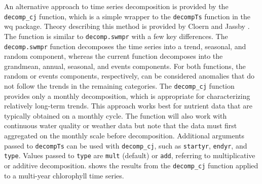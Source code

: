\documentclass[10pt,letterpaper]{article}\usepackage[]{graphicx}\usepackage[]{color}
\begin{document}
An alternative approach to time series decomposition is provided by the \texttt{decomp\_cj} function, which is a simple wrapper to the \texttt{decompTs} function in the wq package.  Theory describing this method is provided by Cloern and Jassby \cite{Cloern10}.  The function is similar to \texttt{decomp.swmpr} with a few key differences.  The \texttt{decomp.swmpr} function decomposes the time series into a trend, seasonal, and random component, whereas the current function decomposes into the grandmean, annual, seasonal, and events components.  For both functions, the random or events components, respectively, can be considered anomalies that do not follow the trends in the remaining categories.  The \texttt{decomp\_cj} function provides only a monthly decomposition, which is appropriate for characterizing relatively long-term trends.  This approach works best for nutrient data that are typically obtained on a monthly cycle.  The function will also work with continuous water quality or weather data but note that the data must first aggregated on the monthly scale before decomposition.  Additional arguments passed to \texttt{decompTs} can be used with \texttt{decomp\_cj}, such as \texttt{startyr}, \texttt{endyr}, and \texttt{type}.  Values passed to \texttt{type} are \texttt{mult} (default) or \texttt{add}, referring to multiplicative or additive decomposition.   shows the results from the \texttt{decomp\_cj} function applied to a multi-year chlorophyll time series.
\end{document}
